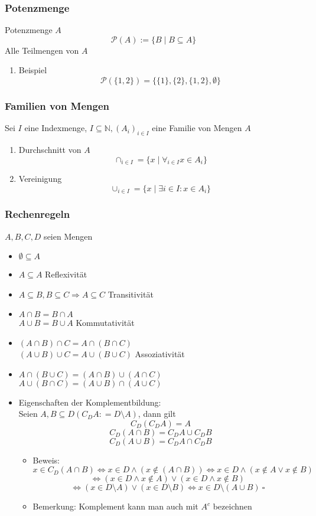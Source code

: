 \documentclass[11pt]{article}
\DeclareMathOperator{\Forall}{\forall}%
\begin{document}
\subsubsection{Potenzmenge}
\label{sec-2-2-3}
Potenzmenge $A$
\[\mathcal{P}(A) := \{B\mid B\subseteq A\}\]
Alle Teilmengen von $A$
\begin{enumerate}
\item Beispiel
\label{sec-2-2-3-1}
\[\mathcal{P}(\{1,2\}) = \{\{1\}, \{2\}, \{1,2\}, \emptyset\}\]
\end{enumerate}
\subsubsection{Familien von Mengen}
\label{sec-2-2-4}
Sei $I$ eine Indexmenge, $I \subseteq \mathbb{N}, (A_i)_{i\in I}$ eine Familie von Mengen $A$
\begin{enumerate}
\item Durchschnitt von $A$
\label{sec-2-2-4-1}
\[\cap_{i\in I} = \{x\mid \Forall_{i\in I} x\in A_i\}\]
\item Vereinigung
\label{sec-2-2-4-2}
\[\cup_{i\in I} = \{x\mid\exists i\in I: x\in A_i\}\]
\end{enumerate}
\subsubsection{Rechenregeln}
\label{sec-2-2-5}
$A,B,C,D$ seien Mengen
\begin{itemize}
\item $\emptyset \subseteq A$
\item $A\subseteq A$ \hfill Reflexivität
\item $A\subseteq B, B\subseteq C \Rightarrow A\subseteq C$ \hfill Transitivität
\item $A\cap B = B\cap A$ \\ $A\cup B = B\cup A$ \hfill Kommutativität
\item $(A\cap B)\cap C = A\cap (B\cap C)$ \\ $(A\cup B) \cup C = A\cup (B\cup C)$ \hfill Assoziativität
\item $A\cap (B\cup C) =(A\cap B) \cup (A\cap C)$ \\ $A\cup (B\cap C) =(A\cup B) \cap (A\cup C)$
\item Eigenschaften der Komplementbildung: \\
      Seien $A,B \subseteq D (C_D A: = D\setminus A)$, dann gilt \[C_D (C_D A) = A\] \[C_D(A\cap B) = C_D A \cup C_D B\] \[C_D(A\cup B) = C_D A \cap C_D B\]
\begin{itemize}
\item Beweis:
\[x\in C_D(A\cap B) \Leftrightarrow x\in D \wedge (x\not\in (A\cap B)) \Leftrightarrow x\in D \wedge (x\not\in A \vee x\not\in B)\] \[\Leftrightarrow (x\in D\wedge x\not\in A) \vee (x\in D \wedge x\not\in B)\] \[\Leftrightarrow (x\in D\setminus A) \vee (x\in D\setminus B) \Leftrightarrow x\in D\setminus(A\cup B)~\square\]
\item Bemerkung: Komplement kann man auch mit $A^c$ bezeichnen
\end{itemize}
\end{itemize}
\end{document}

